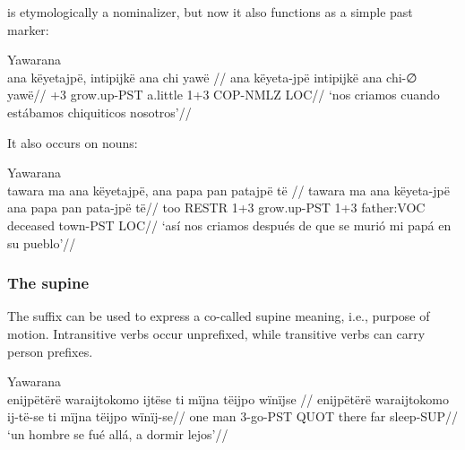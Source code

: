 \documentclass{article}
\begin{document}
 is etymologically a nominalizer, but now it also functions as
a simple past marker:

\ex Yawarana \\
\label{anfoperso-02}\begingl
\glpreamble  ana këyetajpë, intipijkë ana chi yawë //
\gla ana këyeta-jpë intipijkë ana chi-∅ yawë//
+3 grow.up-PST a.little 1+3 COP-NMLZ LOC//
\glft ‘nos criamos cuando estábamos chiquiticos nosotros’//  
\endgl 
\xe

It also occurs on nouns:

\ex Yawarana \\
\label{anfoperso-17}\begingl
\glpreamble  tawara ma ana këyetajpë, ana papa pan patajpë të //
\gla tawara ma ana këyeta-jpë ana papa pan pata-jpë të//
\glb too RESTR 1+3 grow.up-PST 1+3 father:VOC deceased town-PST LOC//
\glft ‘así nos criamos después de que se murió mi papá en su pueblo’//  
\endgl 
\xe

\subsubsection{The supine}

The suffix  can be used to express a co-called supine meaning,
i.e., purpose of motion. Intransitive verbs occur unprefixed, while
transitive verbs can carry person prefixes.

\ex Yawarana \\
\label{ctorat-03}\begingl
\glpreamble  enijpëtërë waraijtokomo ijtëse ti mïjna tëijpo wïnïjse //
\gla enijpëtërë waraijtokomo ij-të-se ti mïjna tëijpo wïnïj-se//
\glb one man 3-go-PST QUOT there far sleep-SUP//
\glft ‘un hombre se fué allá, a dormir lejos’//  
\endgl 
\xe

\printbibliography
\end{document}
